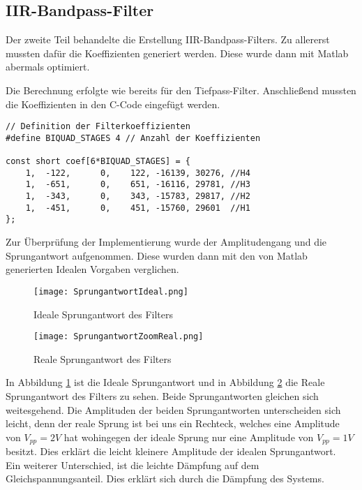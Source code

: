\subsection*{IIR-Bandpass-Filter}
Der zweite Teil behandelte die Erstellung IIR-Bandpass-Filters. Zu allererst mussten dafür die Koeffizienten generiert werden. Diese wurde dann mit Matlab abermals optimiert.


Die Berechnung erfolgte wie bereits für den Tiefpass-Filter. Anschließend mussten die Koeffizienten in den C-Code eingefügt werden.\\
\begin{adjustbox}{width=\textwidth, keepaspectratio} 
  \label{code:procdataKompFIR}
  \begin{lstlisting}[title=Codeausschnitt der modifizierten process\_data.c]
// Definition der Filterkoeffizienten
#define BIQUAD_STAGES 4 // Anzahl der Koeffizienten

const short coef[6*BIQUAD_STAGES] = {
	1,  -122,	   0,	 122, -16139, 30276, //H4
	1,  -651,      0,	 651, -16116, 29781, //H3
	1,  -343,      0,	 343, -15783, 29817, //H2
	1,  -451,	   0,	 451, -15760, 29601  //H1
};
  \end{lstlisting}
\end{adjustbox}

Zur Überprüfung der Implementierung wurde der Amplitudengang und die Sprungantwort aufgenommen. Diese wurden dann mit den von Matlab generierten Idealen Vorgaben verglichen.
\begin{figure}[H]
  \centering
    \texttt{[image: SprungantwortIdeal.png]}
  \caption{Ideale Sprungantwort des Filters}
  \label{fig:SprungBandIdeal}
\end{figure}
\begin{figure}[H]
  \centering
    \texttt{[image: SprungantwortZoomReal.png]}
  \caption{Reale Sprungantwort des Filters}
  \label{fig:SprungBandReal}
\end{figure}

In Abbildung \ref{fig:SprungBandIdeal} ist die Ideale Sprungantwort und in Abbildung \ref{fig:SprungBandReal} die Reale Sprungantwort des Filters zu sehen.
Beide Sprungantworten gleichen sich weitesgehend. Die Amplituden der beiden Sprungantworten unterscheiden sich leicht, denn der reale Sprung ist bei uns ein Rechteck, welches eine Amplitude von \begin{math} V_{pp} = 2V \end{math} hat wohingegen der ideale Sprung nur eine Amplitude von \begin{math} V_{pp} = 1V \end{math} besitzt. Dies erklärt die leicht kleinere Amplitude der idealen Sprungantwort.\\ Ein weiterer Unterschied, ist die leichte Dämpfung auf dem Gleichspannungsanteil. Dies erklärt sich durch die Dämpfung des Systems.

